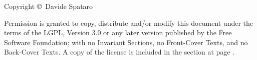 \null\vfill
\noindent
Copyright \copyright \the\year\ Davide Spataro\par
Permission is granted to copy, distribute and/or modify this document under the terms of the LGPL, Version 3.0 or any later version published by the Free Software Foundation; with no Invariant Sections, no Front-Cover Texts, and no Back-Cover Texts. A copy of the license is included in the section  at page \pageref{license:gnu}. 




